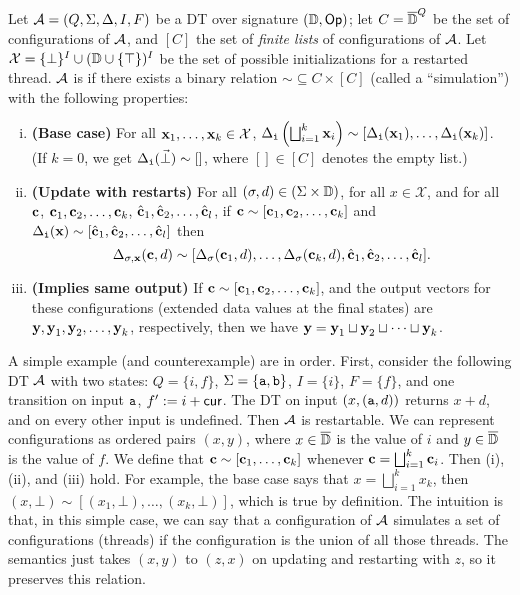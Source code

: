 \begin{definition}[Restartability]
\label{definition:restartability}
Let $\mathcal{A} = (Q, \Sigma, \Delta, I, F)$ be a DT over signature $(\mathbb{D}, \textsf{Op})$;
let $C = \overline{\mathbb{D}{}}^Q$ be the set of configurations of $\mathcal{A}$, and
$[C]$ the set of \emph{finite lists} of configurations of $\mathcal{A}$.
Let $\mathcal{X} = \{\bot\}^I \cup (\mathbb{D} \cup \{\top\})^I$ be the set of possible initializations for a restarted thread.
$\mathcal{A}$ is  if there exists a binary relation $\sim \subseteq C \times [C]$
(called a ``simulation'') with the following properties:
\begin{enumerate}[i.]
\item \textbf{(Base case)}
  For all $\textbf{x}_1, \ldots, \textbf{x}_k \in \mathcal{X}$,
  $\Delta_{{\texttt{i}}}\left(\bigsqcup_{i=1}^k \textbf{x}_i\right) \sim [\Delta_{{\texttt{i}}}(\textbf{x}_1),\ldots,\Delta_{{\texttt{i}}}(\textbf{x}_k)]$. (If $k = 0$, we get $\Delta_{{\texttt{i}}}(\vec{\bot}) \sim []$, where $[] \in [C]$ denotes the empty list.)
\item
  \textbf{(Update with restarts)} For all $(\sigma, d) \in (\Sigma \times \mathbb{D})$,
  for all $x \in \mathcal{X}$,
  and for all $\textbf{c}$, $\textbf{c}_1, \textbf{c}_2, \ldots, \textbf{c}_k$, $\hat{\textbf{c}}_1, \hat{\textbf{c}}_2, \ldots, \hat{\textbf{c}}_l$,
  if $\textbf{c} \sim [\textbf{c}_1, \textbf{c}_2, \ldots, \textbf{c}_k]$
  and $\Delta_{{\texttt{i}}}(\textbf{x}) \sim [\hat{\textbf{c}}_1, \hat{\textbf{c}}_2, \ldots, \hat{\textbf{c}}_l]$
  then
  \[\Delta_{\sigma,\textbf{x}}(\textbf{c},d) \sim [\Delta_{\sigma}(\textbf{c}_1,d), \ldots, \Delta_{\sigma}(\textbf{c}_k,d), \hat{\textbf{c}}_1, \hat{\textbf{c}}_2, \ldots, \hat{\textbf{c}}_l].\]
\item
  \textbf{(Implies same output)}
  If $\textbf{c} \sim [\textbf{c}_1, \textbf{c}_2, \ldots, \textbf{c}_k]$,
  and the output vectors for these configurations (extended data values at the final states) are $\textbf{y}, \textbf{y}_1, \textbf{y}_2, \ldots, \textbf{y}_k$, respectively, then we have $\textbf{y} = \textbf{y}_1 \sqcup \textbf{y}_2 \sqcup \cdots \sqcup \textbf{y}_k$.
\end{enumerate}
\end{definition}

A simple example (and counterexample) are in order. First, consider the following DT $\mathcal{A}$ with two states: $Q = \{i,f\}$, $\Sigma = \{{\texttt{a}},{\texttt{b}}\}$, $I = \{i\}$, $F = \{f\}$, and one transition on input ${\texttt{a}}$, $f' := i + \mathsf{cur}$. The DT on input $(x,({\texttt{a}},d))$ returns $x + d$, and on every other input is undefined. Then $\mathcal{A}$ is restartable. We can represent configurations as ordered pairs $(x,y)$, where $x \in \overline{\mathbb{D}{}}$ is the value of $i$ and $y \in \overline{\mathbb{D}{}}$ is the value of $f$. We define that $\textbf{c} \sim [\textbf{c}_1, \ldots, \textbf{c}_k]$ whenever $\textbf{c} = \bigsqcup_{i=1}^k \textbf{c}_i$. Then (i), (ii), and (iii) hold. For example, the base case says that $x = \bigsqcup_{i=1}^k x_k$, then $(x,\bot) \sim [(x_1,\bot), \ldots, (x_k,\bot)]$, which is true by definition.
The intuition is that, in this simple case, we can say that a configuration of $\mathcal{A}$ simulates a set of configurations (threads) if the configuration is the union of all those threads. The semantics just takes $(x,y)$ to $(z,x)$ on updating and restarting with $z$, so it preserves this relation.

